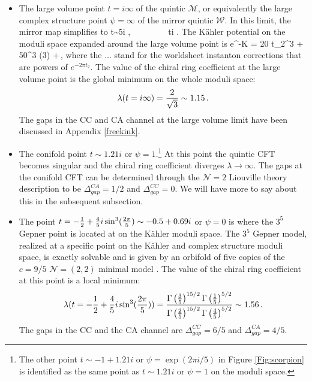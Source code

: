 \documentclass[12pt]{article}
\begin{document}
\begin{itemize}
\item The large volume point $t= i \infty$ of the quintic $\mathcal{M}$, or equivalently the large complex structure point $\psi=\infty$ of the mirror quintic $\mathcal{W}$. In this limit, the mirror map simplifies to
\ie
t\sim {5i \pi }\psi,~~~~~\psi\to \infty~~~~t\to i \infty.
\fe
The K\"ahler potential on the moduli space expanded  around the large volume point is 
\ie
e^{-K} =  {20} t_2^3 + {50\over \pi^3} \zeta(3) +\cdots\,,
\fe
where the $\dots$ stand for the worldsheet instanton corrections that are powers of $e^{-2\pi t_2}$.   The value of the chiral ring coefficient at the large volume point is the global minimum on the whole moduli space:
\begin{align}
\lambda(t=i\infty) = {2\over\sqrt{3}} \sim 1.15\,.
\end{align}
The gaps in the CC and CA channel at the large volume limit have been discussed in Appendix \ref{freekink}.


\item The conifold point $t\sim 1.21i$ or $\psi=1$.\footnote{The other point $t\sim -1+1.21i $ or $\psi=\exp(2\pi i /5)$ in Figure \ref{Fig:scorpion} is identified as the same point as $t\sim 1.21i$ or $\psi=1$ on the moduli space.}  At this point the quintic CFT becomes singular and the chiral ring coefficient diverges $\lambda \to \infty$.  The gaps at the conifold CFT can be determined through the $\mathcal{N}=2$ Liouville theory description to be $\Delta^{CA}_{gap}=1/2$ and $\Delta_{gap}^{CC}=0$.  We will have more to say about this in the subsequent subsection.


\item The point $t=-\frac12 +\frac45 i \sin^3({2\pi\over5})\sim -0.5 + 0.69i$ or $\psi=0$ is where the $3^5$ Gepner point is located  at on the K\"ahler moduli space. The $3^5$ Gepner model, realized at a specific point on the K\"ahler and complex structure moduli space, is exactly solvable and is given by an orbifold of five copies of the $c=9/5$ $\mathcal{N}=(2,2)$ minimal model \cite{Gepner:1987vz}.  The value of the chiral ring coefficient at this point is a local minimum:
\begin{align}
\lambda(t=-\frac12 +\frac45 i \sin^3({2\pi\over5}))=\frac{\Gamma \left(\frac{3}{5}\right)^{15/2} \Gamma \left(\frac{1}{5}\right)^{5/2}}{\Gamma \left(\frac{2}{5}\right)^{15/2} \Gamma \left(\frac{4}{5}\right)^{5/2}}\sim 1.56\,.
\end{align}
The gaps in the CC and the CA channel are $\Delta^{CC}_{gap}=6/5$ and $\Delta^{CA}_{gap}=4/5$.

\end{itemize}
\end{document}
